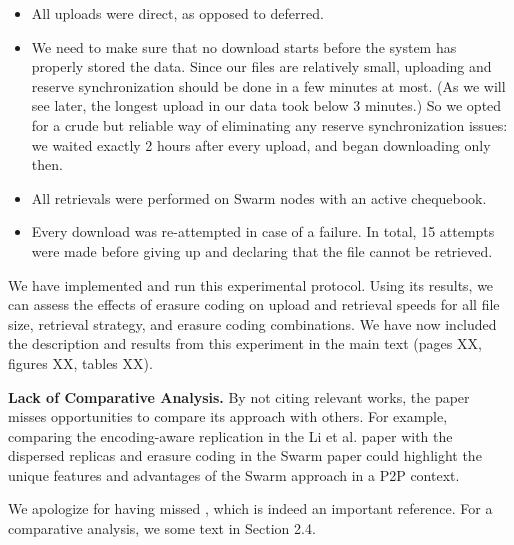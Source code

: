 \documentclass[11pt]{article}
\newcommand{\us}{\rm \setlength{\leftskip}{0.3cm} \setlength{\rightskip}{0.3cm}}
\newcommand{\them}{\it \setlength{\leftskip}{0cm} \setlength{\rightskip}{0cm}}
\begin{document}
\begin{itemize}
\item All uploads were direct, as opposed to deferred.
\item We need to make sure that no download starts before the system has properly stored the data. Since our files are relatively small, uploading and reserve synchronization should be done in a few minutes at most. (As we will see later, the longest upload in our data took below 3 minutes.) So we opted for a crude but reliable way of eliminating any reserve synchronization issues: we waited exactly 2 hours after every upload, and began downloading only then.
\item All retrievals were performed on Swarm nodes with an active chequebook.
\item Every download was re-attempted in case of a failure. In total, 15 attempts were made before giving up and declaring that the file cannot be retrieved.
\end{itemize}

We have implemented and run this experimental protocol. Using its results, we can assess the effects of erasure coding on upload and retrieval speeds for all file size, retrieval strategy, and erasure coding combinations. We have now included the description and results from this experiment in the main text (pages XX, figures XX, tables XX).

\them

\textbf{Lack of Comparative Analysis.} By not citing relevant works, the paper misses opportunities to compare its approach with others. For example, comparing the encoding-aware replication in the Li et al. paper with the dispersed replicas and erasure coding in the Swarm paper could highlight the unique features and advantages of the Swarm approach in a P2P context.

\us

We apologize for having missed \citet{li2017enabling}, which is indeed an important reference. For a comparative analysis, we some text in Section 2.4.


\them \rm




\end{document}
